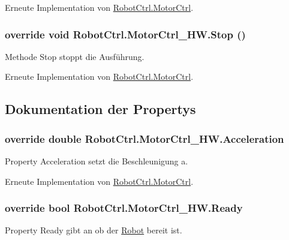 Erneute Implementation von \hyperlink{class_robot_ctrl_1_1_motor_ctrl_ac6e7ec6b155d337dddf2fe1bc660c11b}{RobotCtrl.MotorCtrl}.

\hypertarget{class_robot_ctrl_1_1_motor_ctrl___h_w_ad7a992614ff75966b4381f8f8ef56cfd}{
\subsubsection[{Stop}]{\setlength{\rightskip}{0pt plus 5cm}override void RobotCtrl.MotorCtrl\_\-HW.Stop ()}}
\label{class_robot_ctrl_1_1_motor_ctrl___h_w_ad7a992614ff75966b4381f8f8ef56cfd}
Methode Stop stoppt die Ausf\"{u}hrung. 

Erneute Implementation von \hyperlink{class_robot_ctrl_1_1_motor_ctrl_a4e61bcac558a43dd2d1470ded5fed820}{RobotCtrl.MotorCtrl}.



\subsection{Dokumentation der Propertys}
\hypertarget{class_robot_ctrl_1_1_motor_ctrl___h_w_aeee6ccb14bb1c24c2541c64c0ad91c0e}{
\subsubsection[{Acceleration}]{\setlength{\rightskip}{0pt plus 5cm}override double RobotCtrl.MotorCtrl\_\-HW.Acceleration}}
\label{class_robot_ctrl_1_1_motor_ctrl___h_w_aeee6ccb14bb1c24c2541c64c0ad91c0e}
Property Acceleration setzt die Beschleunigung a. 

Erneute Implementation von \hyperlink{class_robot_ctrl_1_1_motor_ctrl_a57bbec274a01f59d5e5ede7599e0ca9f}{RobotCtrl.MotorCtrl}.

\hypertarget{class_robot_ctrl_1_1_motor_ctrl___h_w_aa5f0c2dd90cf577ef951e58e957976c9}{
\subsubsection[{Ready}]{\setlength{\rightskip}{0pt plus 5cm}override bool RobotCtrl.MotorCtrl\_\-HW.Ready}}
\label{class_robot_ctrl_1_1_motor_ctrl___h_w_aa5f0c2dd90cf577ef951e58e957976c9}
Property Ready gibt an ob der \hyperlink{class_robot_ctrl_1_1_robot}{Robot} bereit ist. 

